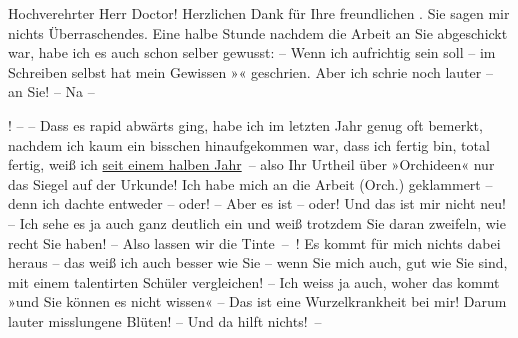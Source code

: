 \pstart\center{}Hochverehrter Herr Doctor!\pend\vspace{0.5em}
\pstart
           Herzlichen Dank für Ihre freundlichen \label{K_L03711-1v}\label{K_L03711-1}. Sie
               sagen mir nichts Überraschendes. Eine halbe Stunde nachdem die Arbeit an Sie abgeschickt war, habe ich es
               auch schon selber gewusst: – Wenn ich aufrichtig sein soll – im Schreiben selbst hat
               mein Gewissen »\label{K_L03711-2v}\label{K_L03711-2}« geschrien. Aber ich schrie noch lauter – \label{K_L03711-3v}\label{K_L03711-3}{ }\label{K_L03711-4v}\label{K_L03711-4} an Sie! – Na – \begin{otherlanguage}{french}\label{K_L03711-5v}\label{K_L03711-5}\end{otherlanguage}! – – Dass es rapid abwärts ging, habe ich im letzten Jahr
               genug oft bemerkt, nachdem ich kaum ein bisschen hinaufgekommen war, dass ich fertig
               bin, total fertig, weiß ich {\pb}\uline{seit einem halben Jahr} – also Ihr Urtheil über »Orchideen« nur das Siegel auf der Urkunde! Ich
               habe mich an die Arbeit \introOben{}(Orch.)\introOben{} geklammert – denn ich dachte entweder – oder! – Aber es ist
               – oder! Und das ist mir nicht neu! – Ich sehe es ja auch ganz deutlich ein und weiß
               trotzdem Sie daran zweifeln, wie recht Sie haben! – Also lassen wir die Tinte – ! Es
               kommt für mich nichts dabei heraus – das weiß ich auch besser wie Sie – wenn Sie {\pb}mich auch, gut wie Sie sind, mit einem talentirten
               Schüler vergleichen! – Ich weiss ja auch, woher das kommt »und Sie können es nicht
               wissen« – Das ist eine Wurzelkrankheit bei mir! Darum lauter misslungene Blüten! –
               Und da hilft nichts! –\pend
           
